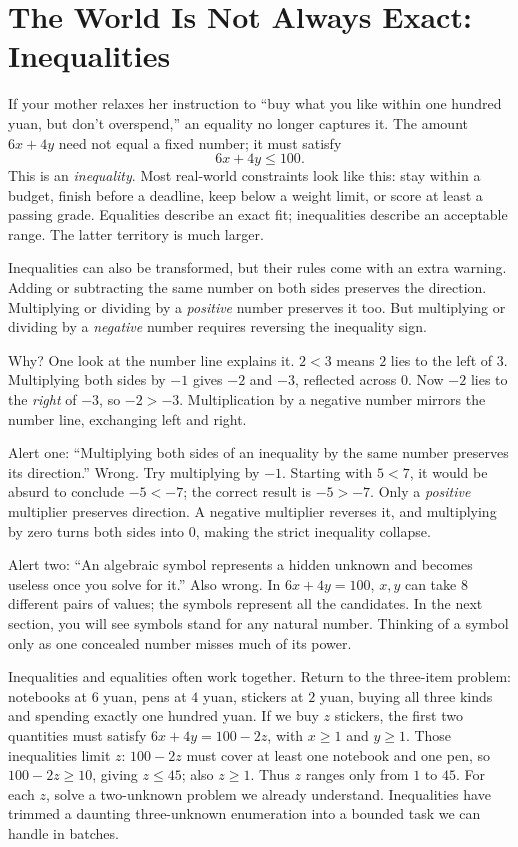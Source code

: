 \section{The World Is Not Always Exact: Inequalities}

If your mother relaxes her instruction to ``buy what you like within one hundred yuan, but don't overspend,'' an equality no longer captures it. The amount $6x+4y$ need not equal a fixed number; it must satisfy
\[
6x+4y\leq 100.
\]
This is an \emph{inequality}. Most real-world constraints look like this: stay within a budget, finish before a deadline, keep below a weight limit, or score at least a passing grade. Equalities describe an exact fit; inequalities describe an acceptable range. The latter territory is much larger.

Inequalities can also be transformed, but their rules come with an extra warning. Adding or subtracting the same number on both sides preserves the direction. Multiplying or dividing by a \emph{positive} number preserves it too. But multiplying or dividing by a \emph{negative} number requires reversing the inequality sign.

Why? One look at the number line explains it. $2<3$ means $2$ lies to the left of $3$. Multiplying both sides by $-1$ gives $-2$ and $-3$, reflected across $0$. Now $-2$ lies to the \emph{right} of $-3$, so $-2>-3$. Multiplication by a negative number mirrors the number line, exchanging left and right.

\begin{fanli}
Alert one: ``Multiplying both sides of an inequality by the same number preserves its direction.'' Wrong. Try multiplying by $-1$. Starting with $5<7$, it would be absurd to conclude $-5<-7$; the correct result is $-5>-7$. Only a \emph{positive} multiplier preserves direction. A negative multiplier reverses it, and multiplying by zero turns both sides into $0$, making the strict inequality collapse.

Alert two: ``An algebraic symbol represents a hidden unknown and becomes useless once you solve for it.'' Also wrong. In $6x+4y=100$, $x,y$ can take $8$ different pairs of values; the symbols represent all the candidates. In the next section, you will see symbols stand for any natural number. Thinking of a symbol only as one concealed number misses much of its power.
\end{fanli}

Inequalities and equalities often work together. Return to the three-item problem: notebooks at $6$ yuan, pens at $4$ yuan, stickers at $2$ yuan, buying all three kinds and spending exactly one hundred yuan. If we buy $z$ stickers, the first two quantities must satisfy $6x+4y=100-2z$, with $x\geq1$ and $y\geq1$. Those inequalities limit $z$: $100-2z$ must cover at least one notebook and one pen, so $100-2z\geq10$, giving $z\leq45$; also $z\geq1$. Thus $z$ ranges only from $1$ to $45$. For each $z$, solve a two-unknown problem we already understand. Inequalities have trimmed a daunting three-unknown enumeration into a bounded task we can handle in batches.

